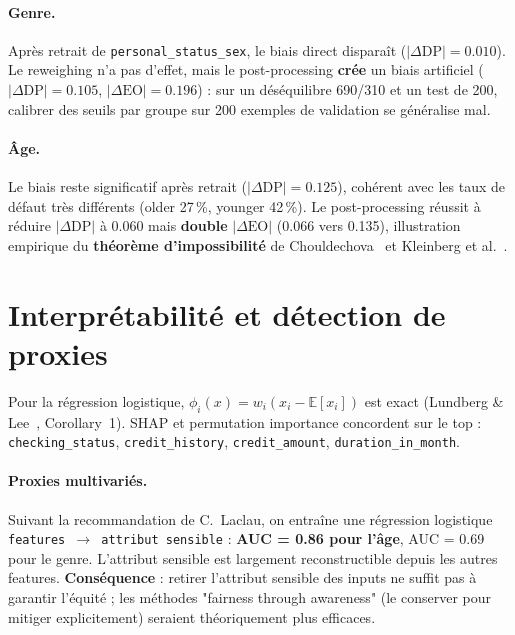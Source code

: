 \documentclass[11pt, a4paper]{article}
\begin{document}
\paragraph{Genre.} Apr\`es retrait de \texttt{personal\_status\_sex}, le biais direct dispara\^it ($|\Delta\text{DP}| = 0.010$). Le reweighing n'a pas d'effet, mais le post-processing \textbf{cr\'ee} un biais artificiel ($|\Delta\text{DP}| = 0.105$, $|\Delta\text{EO}| = 0.196$) : sur un d\'es\'equilibre 690/310 et un test de 200, calibrer des seuils par groupe sur 200 exemples de validation se g\'en\'eralise mal.

\paragraph{\^Age.} Le biais reste significatif apr\`es retrait ($|\Delta\text{DP}| = 0.125$), coh\'erent avec les taux de d\'efaut tr\`es diff\'erents (older 27\,\%, younger 42\,\%). Le post-processing r\'eussit \`a r\'eduire $|\Delta\text{DP}|$ \`a 0.060 mais \textbf{double} $|\Delta\text{EO}|$ (0.066 vers 0.135), illustration empirique du \textbf{th\'eor\`eme d'impossibilit\'e} de Chouldechova~\cite{chouldechova2017} et Kleinberg et al.~\cite{kleinberg2016}.

\section{Interpr\'etabilit\'e et d\'etection de proxies}

Pour la r\'egression logistique, $\phi_i(x) = w_i (x_i - \mathbb{E}[x_i])$ est exact (Lundberg \& Lee~\cite{lundberg2017}, Corollary~1). SHAP et permutation importance concordent sur le top : \texttt{checking\_status}, \texttt{credit\_history}, \texttt{credit\_amount}, \texttt{duration\_in\_month}.

\paragraph{Proxies multivari\'es.} Suivant la recommandation de C.~Laclau, on entra\^ine une r\'egression logistique \texttt{features $\to$ attribut sensible} : \textbf{AUC = 0.86 pour l'\^age}, AUC = 0.69 pour le genre. L'attribut sensible est largement reconstructible depuis les autres features. \textbf{Cons\'equence} : retirer l'attribut sensible des inputs ne suffit pas \`a garantir l'\'equit\'e ; les m\'ethodes "fairness through awareness" (le conserver pour mitiger explicitement) seraient th\'eoriquement plus efficaces.
\end{document}
